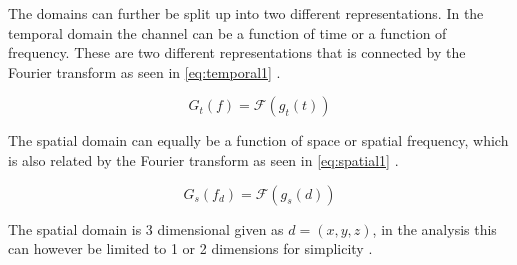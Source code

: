 The domains can further be split up into two different representations. In the temporal domain the channel can be a function of time or a function of frequency. These are two different representations that is connected by the Fourier transform as seen in \autoref{eq:temporal1} \citep[p. 43]{Wireless_CommunicationsBook}.

\begin{equation}\label{eq:temporal1}
G_t(f) = \mathcal{F}(g_t(t))
\end{equation}
\begin{where}
\end{where}


The spatial domain can equally be a function of space or spatial frequency, which is also related by the Fourier transform as seen in \autoref{eq:spatial1} \citep[p. 43]{Wireless_CommunicationsBook}.

\begin{equation}\label{eq:spatial1}
G_s(f_d) = \mathcal{F}(g_s(d))
\end{equation}
\begin{where}
\end{where}


The spatial domain is 3 dimensional given as $d = (x,y,z)$, in the analysis this can however be limited to 1 or 2 dimensions for simplicity \citep{FTandCORR}.

